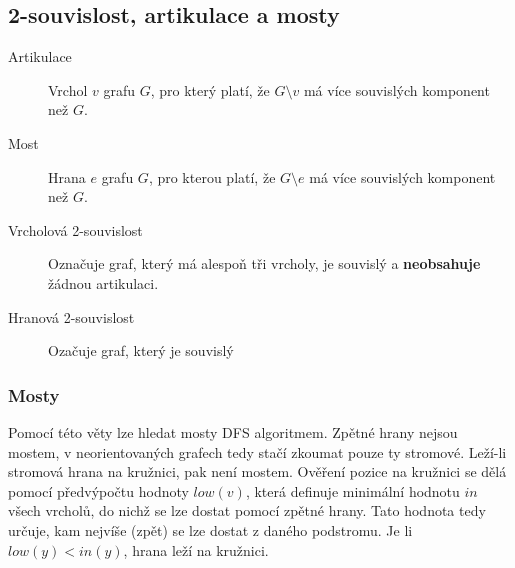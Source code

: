 \subsection{2-souvislost, artikulace a mosty}

\begin{description}
    \item[Artikulace] Vrchol $v$ grafu $G$, pro který platí, že $G \setminus v$ má více souvislých komponent než $G$.
    \item[Most] Hrana $e$ grafu $G$, pro kterou platí, že $G \setminus e$ má více souvislých komponent než $G$.
    \item[Vrcholová 2-souvislost] Označuje graf, který má alespoň tři vrcholy, je souvislý a \textbf{neobsahuje} žádnou artikulaci.
    \item[Hranová 2-souvislost] Ozačuje graf, který je souvislý 
\end{description}

\subsubsection{Mosty}


Pomocí této věty lze hledat mosty DFS algoritmem.
Zpětné hrany nejsou mostem, v neorientovaných grafech tedy stačí zkoumat pouze ty stromové.
Leží-li stromová hrana na kružnici, pak není mostem.
Ověření pozice na kružnici se dělá pomocí předvýpočtu hodnoty $low(v)$, která definuje minimální hodnotu $in$ všech vrcholů, do nichž se lze dostat pomocí zpětné hrany.
Tato hodnota tedy určuje, kam nejvíše (zpět) se lze dostat z daného podstromu.
Je li $low(y) < in(y)$, hrana leží na kružnici.